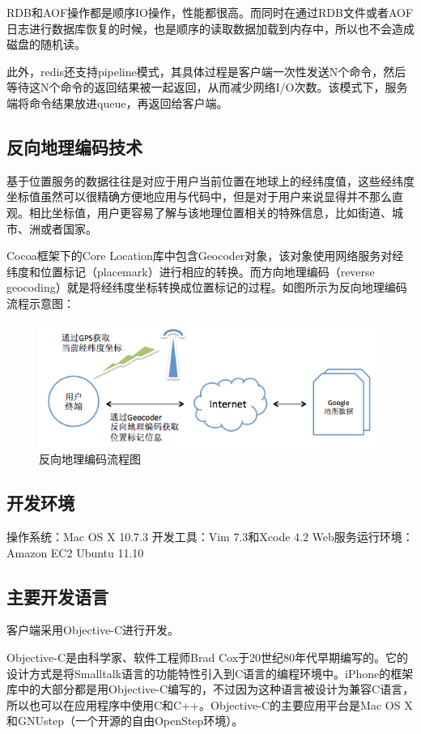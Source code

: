 \documentclass{article}
\begin{document}
\begin{CJK}{UTF8}{gbsn}
  RDB和AOF操作都是顺序IO操作，性能都很高。而同时在通过RDB文件或者AOF日志进行数据库恢复的时候，也是顺序的读取数据加载到内存中，所以也不会造成磁盘的随机读。

  此外，redis还支持pipeline模式，其具体过程是客户端一次性发送N个命令，然后等待这N个命令的返回结果被一起返回，从而减少网络I/O次数。该模式下，服务端将命令结果放进queue，再返回给客户端。

	\subsection{反向地理编码技术}
  基于位置服务的数据往往是对应于用户当前位置在地球上的经纬度值，这些经纬度坐标值虽然可以很精确方便地应用与代码中，但是对于用户来说显得并不那么直观。相比坐标值，用户更容易了解与该地理位置相关的特殊信息，比如街道、城市、洲或者国家。\cite{iOSLIB}

  Cocoa框架下的Core Location库中包含Geocoder对象，该对象使用网络服务对经纬度和位置标记（placemark）进行相应的转换。而方向地理编码（reverse geocoding）就是将经纬度坐标转换成位置标记的过程。如图所示为反向地理编码流程示意图：

  \begin{figure}[htbp]
		\centering
		\includegraphics[bb=0 0 788 288, scale=0.45]{figure/fig_n03.png}
		\caption{反向地理编码流程图}
		\label{fig:n03}
	\end{figure}

	\subsection{开发环境}
  操作系统：Mac OS X 10.7.3
  开发工具：Vim 7.3和Xcode 4.2
  Web服务运行环境：Amazon EC2 Ubuntu 11.10

	\subsection{主要开发语言}
  客户端采用Objective-C进行开发。

  Objective-C是由科学家、软件工程师Brad Cox于20世纪80年代早期编写的。它的设计方式是将Smalltalk语言的功能特性引入到C语言的编程环境中。iPhone的框架库中的大部分都是用Objective-C编写的，不过因为这种语言被设计为兼容C语言，所以也可以在应用程序中使用C和C++。Objective-C的主要应用平台是Mac OS X和GNUstep（一个开源的自由OpenStep环境）。\cite{B03}


\end{CJK}
\end{document}
